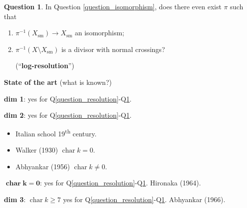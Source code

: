 \documentclass[12pt]{article}
\DeclareMathOperator{\chara}{char}
\theoremstyle{definition}
\newtheorem{question}{Question}
\begin{document}
\begin{question}\label{question_log-resolution}
In Question \ref{question_isomorphism}, does there even exist $\pi$ such that
\begin{enumerate}[label=\roman*)]
\item $\pi^{-1}(X_{\text{sm}})\rightarrow X_{\text{sm}}$ an isomorphism;
\item $\pi^{-1}(X\setminus X_{\text{sm}})$ is a divisor with normal crossings?

\begin{center}
\end{center}

(``\textbf{log-resolution}'')
\end{enumerate}
\end{question}

\textbf{State of the art} (what is known?)

\textbf{dim 1}: yes for Q\ref{question_resolution}-Q\ref{question_log-resolution}.

\textbf{dim 2}: yes for Q\ref{question_resolution}-Q\ref{question_log-resolution}.
\begin{itemize}[label=$-$]
\item Italian school 19\textsuperscript{th} century.
\item Walker (1930) $\chara k=0$.
\item Abhyankar (1956) $\chara k\neq0$.
\end{itemize}

$\boldsymbol{\chara k=0}$: yes for Q\ref{question_resolution}-Q\ref{question_log-resolution}. Hironaka (1964).

\textbf{dim 3}: $\chara k\geq7$ yes for Q\ref{question_resolution}-Q\ref{question_log-resolution}. Abhyankar (1966).
\end{document}
